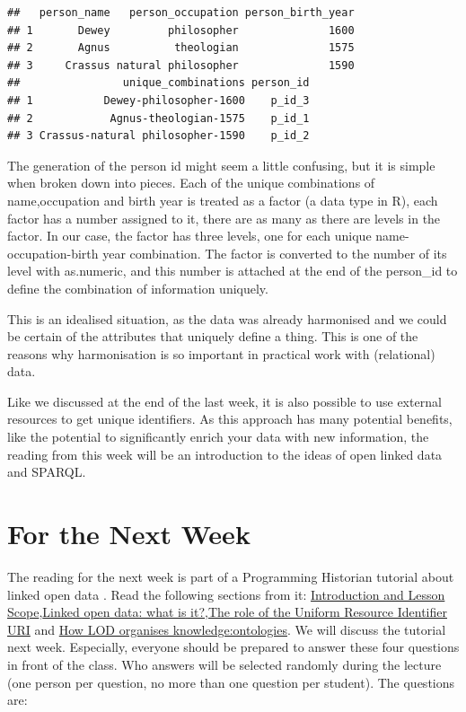 \documentclass[
]{book}
\begin{document}
\begin{verbatim}
##   person_name   person_occupation person_birth_year
## 1       Dewey         philosopher              1600
## 2       Agnus          theologian              1575
## 3     Crassus natural philosopher              1590
##                unique_combinations person_id
## 1           Dewey-philosopher-1600    p_id_3
## 2            Agnus-theologian-1575    p_id_1
## 3 Crassus-natural philosopher-1590    p_id_2
\end{verbatim}

The generation of the person id might seem a little confusing, but it is simple when broken down into pieces. Each of the unique
combinations of name,occupation and birth year is treated as a factor (a data type in R), each factor has a number assigned to it, there are as many as there are levels in the factor. In our case, the factor has three levels, one for each unique name-occupation-birth year combination. The factor is converted to the number of its level with as.numeric, and this number is attached at the end of the person\_id to define the combination of information uniquely.

This is an idealised situation, as the data was already harmonised and we could be certain of the attributes that uniquely define a thing.
This is one of the reasons why harmonisation is so important in practical work with (relational) data.

Like we discussed at the end of the last week, it is also possible to use external resources to get unique identifiers. As this approach has many potential benefits, like the potential to significantly enrich your data with new information, the reading from this week will be an introduction to the ideas of open linked data and SPARQL.

\hypertarget{for-the-next-week-1}{%
\section{For the Next Week}\label{for-the-next-week-1}}

The reading for the next week is part of a Programming Historian tutorial about linked open data \citep{Blaney2017}. Read the following sections from it: \href{https://programminghistorian.org/en/lessons/intro-to-linked-data\#introduction-and-lesson-scope}{Introduction and Lesson Scope},\href{https://programminghistorian.org/en/lessons/intro-to-linked-data\#linked-open-data-what-is-it}{Linked open data: what is it?},\href{https://programminghistorian.org/en/lessons/intro-to-linked-data\#the-role-of-the-uniform-resource-identifier-uri}{The role of the Uniform Resource Identifier URI} and \href{https://programminghistorian.org/en/lessons/intro-to-linked-data\#how-lod-organises-knowledge-ontologies}{How LOD organises knowledge:ontologies}. We will discuss the tutorial next week. Especially, everyone should be prepared to answer these four questions in front of the class. Who answers will be selected randomly during the lecture (one person per question, no more than one question per student). The questions are:
\end{document}
